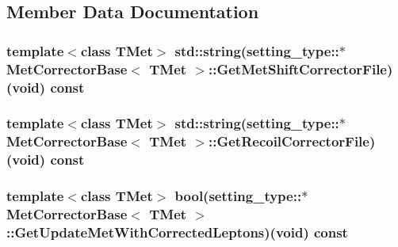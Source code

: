 \subsection{Member Data Documentation}
\hypertarget{classMetCorrectorBase_ae8439b8b315c598df5771d88cd245a49}{
\subsubsection[{GetMetShiftCorrectorFile}]{\setlength{\rightskip}{0pt plus 5cm}template$<$class TMet$>$ std::string(setting\_\-type::$\ast$ {\bf MetCorrectorBase}$<$ TMet $>$::{\bf GetMetShiftCorrectorFile})(void) const }}
\label{classMetCorrectorBase_ae8439b8b315c598df5771d88cd245a49}
\hypertarget{classMetCorrectorBase_ab75acb883f87b203f02497a8ac1d9612}{
\subsubsection[{GetRecoilCorrectorFile}]{\setlength{\rightskip}{0pt plus 5cm}template$<$class TMet$>$ std::string(setting\_\-type::$\ast$ {\bf MetCorrectorBase}$<$ TMet $>$::{\bf GetRecoilCorrectorFile})(void) const }}
\label{classMetCorrectorBase_ab75acb883f87b203f02497a8ac1d9612}
\hypertarget{classMetCorrectorBase_a9ee54f0240f3285b68a6a8290618cfad}{
\subsubsection[{GetUpdateMetWithCorrectedLeptons}]{\setlength{\rightskip}{0pt plus 5cm}template$<$class TMet$>$ bool(setting\_\-type::$\ast$ {\bf MetCorrectorBase}$<$ TMet $>$::{\bf GetUpdateMetWithCorrectedLeptons})(void) const }}
\label{classMetCorrectorBase_a9ee54f0240f3285b68a6a8290618cfad}
